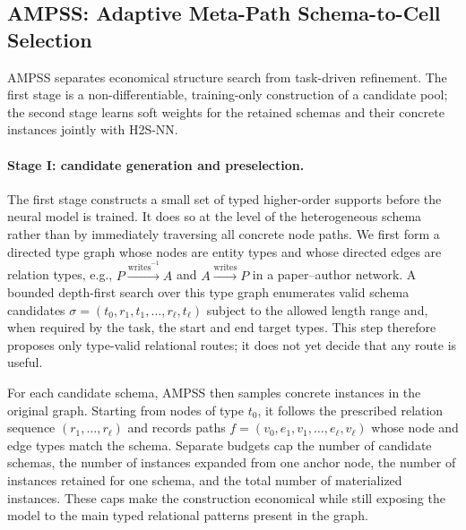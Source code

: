 \documentclass[sigconf,anonymous,review]{acmart}
\newcommand{\method}{\textsc{H2S-NN}}
\newcommand{\ampss}{\textsc{AMPSS}}
\begin{document}
\subsection{\ampss{}: Adaptive Meta-Path Schema-to-Cell Selection}
\label{sec:ampss}

\ampss{} separates economical structure search from task-driven refinement.  The first stage is a
non-differentiable, training-only construction of a candidate pool; the second stage learns soft
weights for the retained schemas and their concrete instances jointly with \method{}.

\paragraph{Stage I: candidate generation and preselection.}
The first stage constructs a small set of typed higher-order supports before the neural model is
trained.  It does so at the level of the heterogeneous schema rather than by immediately traversing
all concrete node paths.  We first form a directed type graph whose nodes are entity types and whose
directed edges are relation types, e.g., \(P\xrightarrow{\mathrm{writes}^{-1}}A\) and
\(A\xrightarrow{\mathrm{writes}}P\) in a paper--author network.  A bounded depth-first search over
this type graph enumerates valid schema candidates
\(\sigma=(t_0,r_1,t_1,\ldots,r_\ell,t_\ell)\) subject to the allowed length range and, when
required by the task, the start and end target types.  This step therefore proposes only type-valid
relational routes; it does not yet decide that any route is useful.

For each candidate schema, \ampss{} then samples concrete instances in the original graph.  Starting
from nodes of type \(t_0\), it follows the prescribed relation sequence
\((r_1,\ldots,r_\ell)\) and records paths
\(f=(v_0,e_1,v_1,\ldots,e_\ell,v_\ell)\) whose node and edge types match the schema.  Separate
budgets cap the number of candidate schemas, the number of instances expanded from one anchor node,
the number of instances retained for one schema, and the total number of materialized instances.
These caps make the construction economical while still exposing the model to the main typed
relational patterns present in the graph.
\end{document}
